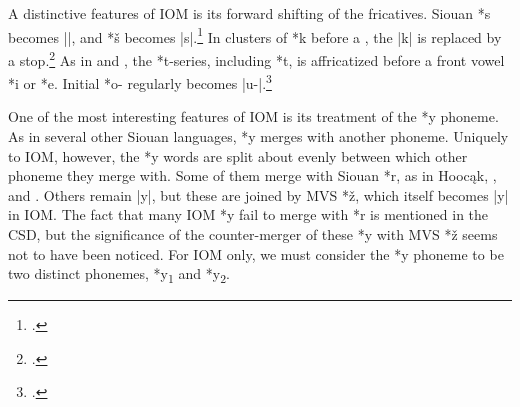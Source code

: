 \documentclass[output=paper]{LSP/langsci}
\begin{document}

A distinctive features of IOM is its forward shifting of the fricatives.  Siouan *s becomes ||, and *š becomes |s|.\footnote{\citealt[245]{Rankinetal2006PDF}. } In clusters of *k before a , the |k| is replaced by a  stop.\footnote{\citealt[857]{Rankinetal2006PDF}.}  As in  and , the *t-series, including *t\textsuperscript{}, is affricatized before a front vowel *i or *e.  Initial *o- regularly becomes |u-|.\footnote{\citealt[893]{Rankinetal2006PDF}.}

One of the most interesting features of IOM is its treatment of the  *y phoneme.  As in several other Siouan languages,  *y merges with another phoneme.  Uniquely to IOM, however, the *y words are split about evenly between which other phoneme they merge with.  Some of them merge with Siouan *r, as in Hooc\k{a}k, ,  and .  Others remain |y|, but these are joined by MVS *\v{z}, which itself becomes |y| in IOM.  The fact that many IOM *y fail to merge with *r is mentioned in the CSD, but the significance of the counter-merger of these *y with MVS *\v{z} seems not to have been noticed.  For IOM only, we must consider the *y phoneme to be two distinct phonemes, *y\textsubscript{1} and *y\textsubscript{2}.
\end{document}
